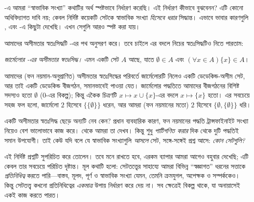 \documentclass[../../../include/open-logic-section]{subfiles}
\begin{document}


-এ আমরা ``স্বাভাবিক
সংখ্যা'' কথাটির অর্থ স্পষ্টভাবে নির্ধারণ করেছি। এই
নির্ধারণ কীভাবে বুঝবেনন? এটি কোনো অধিবিদ্যাগত দাবি নয়;
কেবল নির্দিষ্ট কয়েকটি সেটকে স্বাভাবিক সংখ্যা
\emph{হিসেবে ধরার} সিদ্ধান্ত। এভাবে ভাবার কারণগুলি
,  এবং
-এ কিছুটা দেখেছি।
এখন সেগুলি আরও স্পষ্ট করা যায়।

আমাদের অসীমতার স্বতঃসিদ্ধটি \citet{VonNeumann1925}-এর
পথ অনুসরণ করে। তবে চাইলে এর বদলে নিচের স্বতঃসিদ্ধটিও
নিতে পারতাম:

\begin{defish}
\emph{জার্মেলোর \citeyear{Zermelo1908Untersuchungen}-এর
অসীমতার স্বতঃসিদ্ধ।} এমন একটি সেট $A$ আছে, যাতে
$\emptyset \in A$ এবং $(\forall x \in A)\{x\} \in A$।
\end{defish}

আমাদের (ফন নয়মান-অনুপ্রাণিত) অসীমতার স্বতঃসিদ্ধের
পরিবর্তে জার্মেলোরটি নিলেও একটি ডেডেকিন্ড-অসীম সেট,
আর তাই একটি ডেডেকিন্ড বীজগঠন, সমানভাবেই পাওয়া যেত।
জার্মেলোর পদ্ধতিতে আমাদের বীজগঠনের বিশিষ্ট সদস্যও
হতো $\emptyset$ ($0$-এর বিকল্প); কিন্তু একৈক চিত্রণটি
$x \mapsto x \cup \{x\}$-এর বদলে $x \mapsto \{x\}$
হতো। এর সবচেয়ে সহজ ফল হলো, জার্মেলো $2$ হিসেবে
$\{\{\emptyset\}\}$ ধরেন, আর আমরা (ফন নয়মানের মতো)
$2$ হিসেবে $\{\emptyset, \{\emptyset\}\}$ ধরি।

একটি অসীমতার স্বতঃসিদ্ধ ছেড়ে অন্যটি নেব কেন? প্রধান
ব্যবহারিক কারণ, ফন নয়মানের পদ্ধতি ট্রান্সফাইনাইট সংখ্যা
নিয়েও বেশ ভালোভাবে কাজ করে।
 থেকে আমরা তা দেখব। কিন্তু
শুধু \emph{পাটিগণিত করার} দিক থেকে দুটি পদ্ধতিই
সমান উপযোগী। তাই কেউ যদি বলে যে স্বাভাবিক সংখ্যাগুলি
\emph{আসলে} সেট, সঙ্গে-সঙ্গেই প্রশ্ন আসে:
\emph{কোন সেটগুলি?}

এই নির্দিষ্ট প্রশ্নটি \citet{Benacerraf1965} সুপরিচিত
করে তোলেন। তবে মনে রাখতে হবে, এরকম ব্যাপার আমরা
আগেও বহুবার দেখেছি; এটি কেবল তার সবচেয়ে পরিচিত
দৃষ্টান্ত। মূল কথাটি হলো: সেটতত্ত্বের সাহায্যে আমরা
বিভিন্ন ``স্বজ্ঞাগত'' ধরনের সত্তাকে
\emph{প্রতিনিধিত্ব} করতে পারি—বাস্তব, মূলদ, পূর্ণ ও স্বাভাবিক
সংখ্যা যেমন, তেমনি ক্রমযুগল, অপেক্ষক ও সম্পর্ককেও।
কিন্তু সেটতত্ত্ব কখনো প্রতিনিধিত্বের
\emph{একমাত্র} উপায় নির্ধারণ করে দেয় না। সব ক্ষেত্রেই
বিকল্প থাকে, যা অনায়াসেই একই কাজ করতে পারত।
\end{document}
